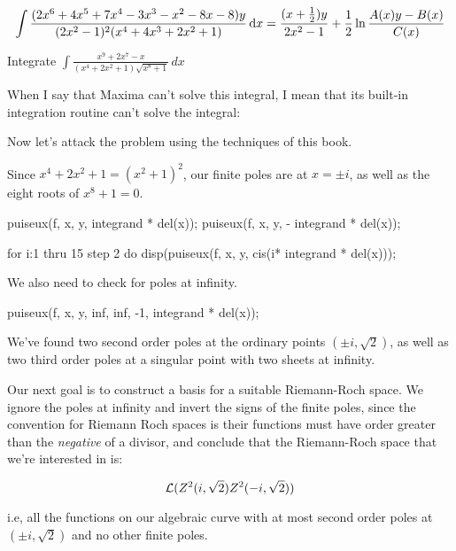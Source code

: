 $$\int {{(2x^6+4x^5+7x^4-3x^3-x^2-8x-8)y}\over{(2x^2-1)^2(x^4+4 x^3+2 x^2+1)}} \,{\rm d}x
= {{(x+{1\over2})y}\over{2x^2-1}} + {1\over2}\ln{{A(x)y - B(x)}\over{C(x)}}
$$


\endexample

\vfill\eject
{}

\example
\label{an integral Maxima can't solve}
Integrate $\int \frac{x^9+2x^7-x}{(x^4+2x^2+1)\sqrt{x^8+1}}\, dx$

When I say that Maxima can't solve this integral, I mean that its
built-in integration routine can't solve the integral:


Now let's attack the problem using the techniques of this book.

Since $x^4+2x^2+1=(x^2+1)^2$, our finite poles are at $x=\pm i$,
as well as the eight roots of $x^8+1=0$.

\begin{maximablock}
puiseux(f, x, y, %
        integrand * del(x));
puiseux(f, x, y, -%
        integrand * del(x));
\end{maximablock}
\begin{maximablocksmall}
for i:1 thru 15 step 2 do
   disp(puiseux(f, x, y, cis(i*%
                integrand * del(x)));
\end{maximablocksmall}

We also need to check for poles at infinity.

\begin{maximablock}
puiseux(f, x, y, inf, inf, -1,
        integrand * del(x));
\end{maximablock}

We've found two second order poles at the ordinary points $(\pm i, )$,
as well as two third order poles at a singular point with two sheets at infinity.

Our next goal is to construct a basis for a suitable Riemann-Roch space.
We ignore the poles at infinity and invert the signs of the finite poles,
since the convention for Riemann Roch spaces is their functions must
have order greater than the {\it negative} of a divisor, and conclude
that the Riemann-Roch space that we're interested in is:

$${\cal L}(Z^2(i, \sqrt{2}) Z^2(-i, \sqrt{2}))$$

i.e, all the functions on our algebraic curve with at most second order
poles at $(\pm i,)$ and no other finite poles.



\endexample
